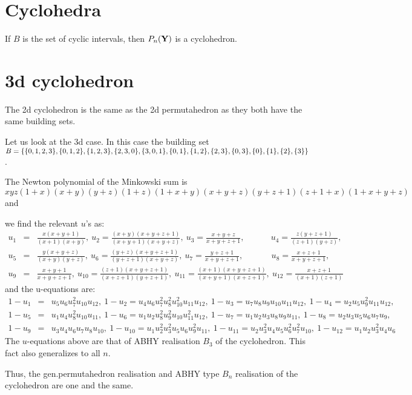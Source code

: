 \documentclass[hidelinks,12pt]{article}
\newcommand{\bea}[1]{\begin{eqnarray}\label{#1} }
\newcommand{\eea}{\end{eqnarray}}
\def\bea{\begin{eqnarray}}
\def\eea{\end{eqnarray}}
\begin{document}
\begin{enumerate}
\section*{Cyclohedra}
If $B$  is the set of cyclic intervals, then $P_n({\bf Y})$ is a cyclohedron.
\section*{3d cyclohedron}
The 2d cyclohedron is the same as the 2d permutahedron as they both have the same building sets.

 Let us look at the 3d case. In this case the building set $B=\{ \{ 0,1,2,3\},\{ 0,1,2\},\{1,2,3\},\{2,3,0\},\{3,0,1\}, \\  \{0,1\},\{1,2\},\{2,3\},\{0,3\},\{0\},\{1\},\{2\},\{3\}\}$.
 
 The Newton polynomial of the Minkowski sum is $x y z(1+x)(x+y)(y+z)(1+z)(1+x+y)(x+y+z)(y+z+1)(z+1+x)(1+x+y+z)$ and 
 
 we  find the relevant $u$'s as:
\bea
u_1 &=&\frac{x (x+y+1)}{(x+1) (x+y)},~u_2 = \frac{(x+y) (x+y+z+1)}{(x+y+1) (x+y+z)},~u_3 = \frac{x+y+z}{x+y+z+1},~~~~~~~~~~~~~~u_4= \frac{z
   (y+z+1)}{(z+1) (y+z)}, \nonumber \\
   u_5 &=& \frac{y (x+y+z)}{(x+y) (y+z)},~u_6 = \frac{(y+z) (x+y+z+1)}{(y+z+1) (x+y+z)},~u_7 =
   \frac{y+z+1}{x+y+z+1},~~~~~~~~~~~~~~~u_8= \frac{x+z+1}{x+y+z+1}, \nonumber \\
   u_9 &=& \frac{x+y+1}{x+y+z+1},~u_{10} = \frac{(z+1) (x+y+z+1)}{(x+z+1) (y+z+1)},~u_{11}=
   \frac{(x+1) (x+y+z+1)}{(x+y+1) (x+z+1)},~u_{12} =\frac{x+z+1}{(x+1) (z+1)} \nonumber
\eea
and the u-equations  are:
\bea
1-u_1&=&u_5 u_6 u_7^2 u_{10} u_{12},~1-u_2=u_4 u_6 u_7^2 u_8^2 u_{10}^2 u_{11} u_{12},~1-u_3=u_7 u_8 u_9 u_{10} u_{11} u_{12},~1-u_4=u_2 u_5
   u_9^2 u_{11} u_{12}, \nonumber \\
   1-u_5 &=& u_1 u_4 u_8^2 u_{10} u_{11},~1-u_6=u_1 u_2 u_8^2 u_9^2 u_{10} u_{11}^2 u_{12},~1-u_7=u_1 u_2 u_3 u_8 u_9
   u_{11},~1-u_8=u_2 u_3 u_5 u_6 u_7 u_9, \nonumber \\
   1-u_9&=&u_3 u_4 u_6 u_7 u_8 u_{10},~1-u_{10}=u_1 u_2^2 u_3^2 u_5 u_6 u_9^2 u_{11},~1-u_{11}=u_2 u_3^2 u_4
   u_5 u_6^2 u_7^2 u_{10},~1-u_{12}=u_1 u_2 u_3^2 u_4 u_6 \nonumber
\eea
The $u$-equations above are that of ABHY realisation $B_3$ of the cyclohedron. This fact also generalizes to all $n$.

Thus, the gen.permutahedron realisation and ABHY type $B_n$ realisation of the cyclohedron are one and the same.


\end{enumerate}
\end{document}
